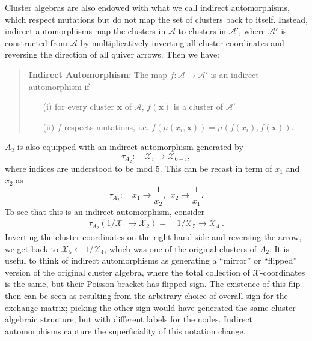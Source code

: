 \documentclass[11pt]{article}
\def\x{\mathcal{X}}
\def\a{\mathcal{A}}
\begin{document}
Cluster algebras are also endowed with what we call indirect automorphisms, which respect mutations but do not map the set of clusters back to itself. Instead, indirect automorphisms map the clusters in $\a$ to clusters in $\a'$, where $\a'$ is constructed from $\a$ by multiplicatively inverting all cluster coordinates and reversing the direction of all quiver arrows. Then we have:
\begin{quote}
{\bf Indirect Automorphism}: The map $f: \a \to \a'$ is an indirect automorphism if 
\vspace{-.2cm}
\begin{itemize}
  \item[(i)] for every cluster $\mathbf{x}$ of $\a$, $f(\mathbf{x})$ is a cluster of $\a'$ 
  \item[(ii)] $f$ respects mutations, i.e. $f(\mu(x_i,\mathbf{x})) = \mu(f(x_i),f(\mathbf{x}))$.
\end{itemize}
\end{quote}
$A_2$ is also equipped with an indirect automorphism generated by
\begin{equation}
  \tau_{A_2}:\quad \mathcal{X}_i \to \mathcal{X}_{6-i},
\end{equation}
where indices are understood to be mod 5. This can be recast in term of $x_1$ and $x_2$ as
\begin{equation}
  \tau_{A_2}:\quad x_1 \to \frac{1}{x_2}, ~~x_2 \to \frac{1}{x_1}.
\end{equation}
To see that this is an indirect automorphism, consider
\begin{align}
  \tau_{A_2}(1/\x_1 \to \x_2) =&~1/\x_5 \to \x_4 \ .
\end{align}
Inverting the cluster coordinates on the right hand side and reversing the arrow, we get back to $\x_5 \leftarrow 1/\x_4$, which was one of the original clusters of $A_2$. It is useful to think of indirect automorphisms as generating a ``mirror'' or ``flipped'' version of the original cluster algebra, where the total collection of $\x$-coordinates is the same, but their Poisson bracket has flipped sign. The existence of this flip then can be seen as resulting from the arbitrary choice of overall sign for the exchange matrix; picking the other sign would have generated the same cluster-algebraic structure, but with different labels for the nodes. Indirect automorphisms capture the superficiality of this notation change.
\end{document}
